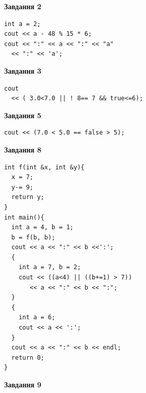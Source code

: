 \documentclass[12pt, ukrainian]{article}
\begin{document}
{\begin {large}
\begin{minipage}[t]{7.0cm}
\end{minipage}
\vline \hspace{1mm}
\begin{minipage}[t]{11.0cm}

\begin{center}
\textbf{Завдання 2}
\end{center}
\vspace{-8mm}

\begin{verbatim}
int a = 2;
cout << a - 48 % 15 * 6;
cout << ":" << a << ":" << "a" 
  << ":" << 'a';
\end{verbatim}



\begin{center}
\textbf{Завдання 3}
\end{center}
\vspace{-8mm}

\begin{verbatim}
cout 
  << ( 3.0<7.0 || ! 8== 7 && true<=6);
\end{verbatim}



\begin{center}
\textbf{Завдання 5}
\end{center}
\vspace{-8mm}

\begin{verbatim}
cout << (7.0 < 5.0 == false > 5);
\end{verbatim}



\begin{center}
\textbf{Завдання 8}
\end{center}
\vspace{-8mm}

\begin{verbatim}
int f(int &x, int &y){
  x = 7;
  y-= 9;
  return y;
}
int main(){
  int a = 4, b = 1;
  b = f(b, b);
  cout << a << ":" << b <<':';
  {
    int a = 7, b = 2;
    cout << ((a<4) || ((b+=1) > 7))
       << a << ":" << b << ":";
  }
  {
    int a = 6;
    cout << a << ':';
  }
  cout << a << ":" << b << endl;
  return 0;
}
\end{verbatim}

\end{minipage}


\begin{minipage}[t]{7.0cm}

\begin{center}
\textbf{Завдання 9}
\end{center}
\vspace{-8mm}


\end{minipage}
\end{large}}
\end{document}

